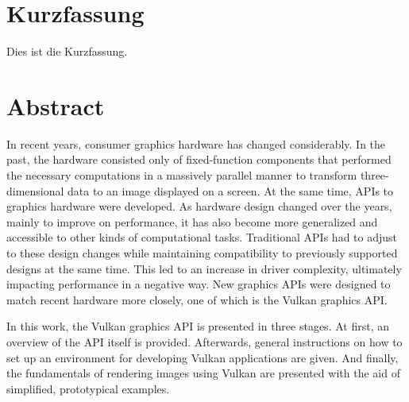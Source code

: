 
{
\chapter*{Kurzfassung}
\label{Abstract_de}
  Dies ist die Kurzfassung.


\newpage
}
{}

\chapter*{Abstract}
\label{Abstract}
  In recent years, consumer graphics hardware has changed considerably.
  In the past, the hardware consisted only of fixed-function components that performed the necessary computations in a massively parallel manner to transform three-dimensional data to an image displayed on a screen.
  At the same time, APIs to graphics hardware were developed.
  As hardware design changed over the years, mainly to improve on performance, it has also become more generalized and accessible to other kinds of computational tasks.
  Traditional APIs had to adjust to these design changes while maintaining compatibility to previously supported designs at the same time.
  This led to an increase in driver complexity, ultimately impacting performance in a negative way.
  New graphics APIs were designed to match recent hardware more closely, one of which is the Vulkan graphics API.

  In this work, the Vulkan graphics API is presented in three stages.
  At first, an overview of the API itself is provided.
  Afterwards, general instructions on how to set up an environment for developing Vulkan applications are given.
  And finally, the fundamentals of rendering images using Vulkan are presented with the aid of simplified, prototypical examples.
